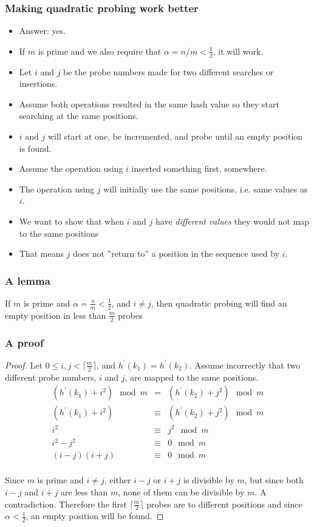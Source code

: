 \documentclass[trans]{beamer}
\begin{document}
\begin{frame}[fragile=singleslide]
\frametitle{Making quadratic probing work better}
\begin{itemize}
\item Answer: yes. 
\item If $m$ is prime and we also require that $\alpha = n/m < \frac{1}{2}$, it will work.
\item Let $i$ and $j$ be the probe numbers made for two different searches or insertions.
\item Assume both operations resulted in the same hash value so they start searching at the same
positions.
\item $i$ and $j$ will start at one, be incremented, and probe until an empty position is found.
\item Assume the operation using $i$ inserted something first, somewhere.
\item The operation using $j$ will initially use the same positions, i.e. same values as $i$.
\item We want to show that when $i$ and $j$ have {\em different values} they would not map to the same positions
\item That means $j$ does not ''return to'' a position in the sequence used by $i$.
\end{itemize}
\end{frame}

\begin{frame}[fragile=singleslide]
\frametitle{A lemma}
\begin{lemma}
If $m$ is prime and $\alpha = \frac{n}{m} < \frac{1}{2}$, and $i\ne j$, then quadratic probing will find an empty position in
less than $\frac{m}{2}$ probes
\end{lemma}
\end{frame}


\begin{frame}[fragile=singleslide]
\frametitle{A proof}
\begin{proof}
{Let $0\le i, j < \lceil \frac{m}{2}\rceil$, and $h^\prime(k_1) = h^\prime(k_2)$. Assume incorrectly that two different probe numbers, $i$ and $j$, are mapped to the same positions.}
\[
\begin{array}{ccc}
(h^\prime(k_1) + i^2) \mod m &=& (h^\prime(k_2) + j^2) \mod m\\
(h^\prime(k_1) + i^2) &\equiv& (h^\prime(k_2) + j^2) \mod m\\
i^2 &\equiv& j^2 \mod m\\
i^2 - j^2 &\equiv& 0 \mod m\\
(i-j)(i+j) &\equiv& 0 \mod m\\
\end{array}
\]

Since $m$ is prime and $i\neq j$, either $i-j$ or $i+j$ is divisible by $m$, but since both $i-j$ and $i+j$ are less than $m$,
none of them can be divisible by $m$. A contradiction.
Therefore the first $\lceil \frac{m}{2}\rceil$ probes are to different positions and since $\alpha < \frac{1}{2}$,
an empty position will be found.
\end{proof}
\end{frame}
\end{document}
